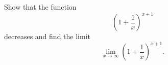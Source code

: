 \begin{exercise}
  \label{ex:hw07:decreasing-euler-approximants}
  Show that the function
  \[
    \left(1+\frac1x\right)^{x+1}
  \]
  decreases and find the limit
  \[
    \lim_{x\to\infty}\left(1+\frac1x\right)^{x+1}.
  \]
\end{exercise}
